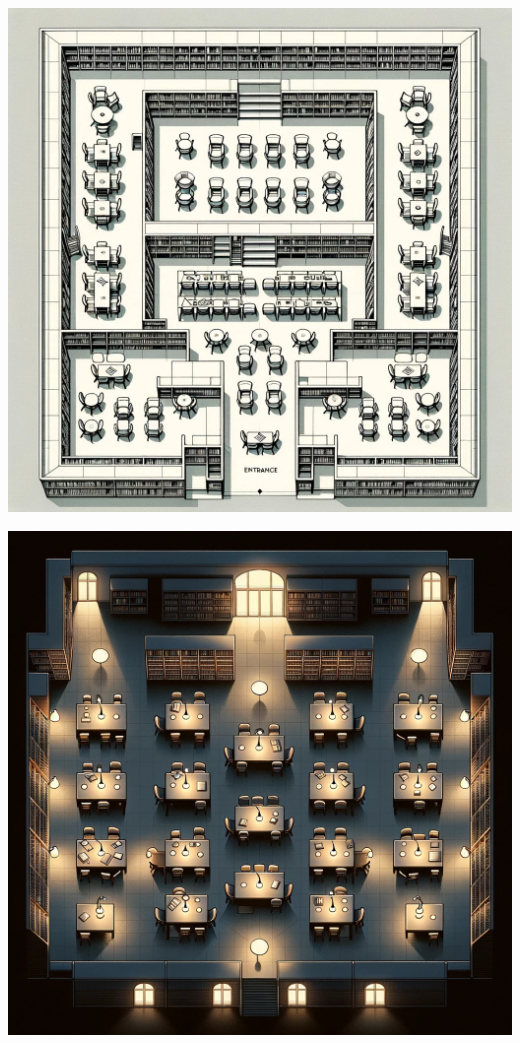 \documentclass{novel}
\begin{document}
\begin{minipage}{0.33\textwidth}
    \includegraphics[width=1\textwidth]{resources/chairs.jpg}
\end{minipage}\hfill
\begin{minipage}{0.33\textwidth}
    \includegraphics[width=1\textwidth]{resources/designDesks.jpg}
\end{minipage}
\end{document}
